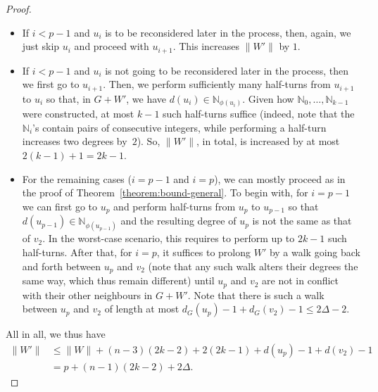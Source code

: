 \documentclass[a4paper,11pt,dvipsnames]{elsarticle}
\begin{document}
\begin{proof}
\begin{itemize}
	\item If $i < p-1$ and $u_i$ is to be reconsidered later in the process, then, again, we just skip $u_i$ and proceed with $u_{i+1}$. This increases $\|W'\|$ by $1$.
	
	\item If $i < p-1$ and $u_i$ is not going to be reconsidered later in the process, then we first go to $u_{i+1}$. Then, 
	we perform sufficiently many half-turns from $u_{i+1}$ to $u_i$ so that, in $G+W'$, we have $d(u_i) \in \mathbb{N}_{\phi(u_i)}$. Given how $\mathbb{N}_0,\dots,\mathbb{N}_{k-1}$ were constructed, at most $k-1$ such half-turns suffice (indeed, note that the $\mathbb{N}_i$'s contain pairs of consecutive integers, while performing a half-turn increases two degrees by~$2$). So, $\|W'\|$, in total, is increased by at most $2(k-1)+1=2k-1$.
	
	\item For the remaining cases ($i=p-1$ and $i=p$), we can mostly proceed as in the proof of Theorem~\ref{theorem:bound-general}. To begin with, for $i=p-1$ we can first go to $u_p$ and perform half-turns from $u_p$ to $u_{p-1}$ so that $d(u_{p-1}) \in \mathbb{N}_{\phi(u_{p-1})}$ and the resulting degree of $u_p$ is not the same as that of $v_2$. In the worst-case scenario, this requires to perform up to $2k-1$ such half-turns. After that, for $i=p$, it suffices to prolong $W'$ by a walk going back and forth between $u_p$ and $v_2$ (note that any such walk alters their degrees the same way, which thus remain different) until $u_p$ and $v_2$ are not in conflict with their other neighbours in $G+W'$. Note that there is such a walk between $u_p$ and $v_2$ of length at most $d_G(u_p)-1+d_G(v_2)-1 \leq 2\Delta-2$.
\end{itemize}

All in all, we thus have 
\begin{align*}
\|W'\| &\leq \|W\| + (n-3)(2k-2)+2(2k-1)+d(u_p)-1+d(v_2)-1\\
&= p + (n-1)(2k-2)+2\Delta.
\end{align*}


\end{proof}
\end{document}
